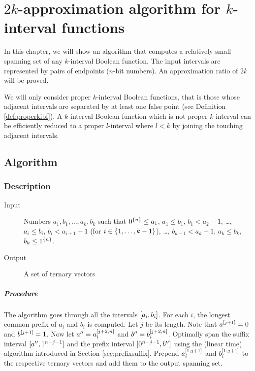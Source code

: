 \chapter{\texorpdfstring{$2k$}{2k}-approximation algorithm
for \texorpdfstring{$k$}{k}-interval functions}
\label{chap:2kapprox}


In this chapter,
we will show an algorithm that computes
a relatively
small spanning set
of any $k$-interval Boolean function.
The input intervals are represented by pairs of endpoints
($n$-bit numbers).
An approximation ratio of $2k$ will be proved.

We will only consider
proper $k$-interval Boolean functions,
that is those whose adjacent intervals are separated by
at least one false point
(see Definition \ref{def:properkibf}).
A $k$-interval Boolean function
which is not proper $k$-interval
can be efficiently reduced to a proper $l$-interval
where $l < k$
by joining the touching adjacent intervals.

\section{Algorithm}

\subsection{Description}

\begin{description}
\item[Input] Numbers $a_1, b_1, \ldots, a_k, b_k$
such that
$0^{\{n\}} \leq a_1$,
$a_1 \leq b_1$,
$b_1 < a_2 - 1$,
\ldots,
$a_i \leq b_i$,
$b_i < a_{i+1} - 1$
(for $i \in \{1, \ldots, k-1\}$),
\ldots,
$b_{k-1} < a_k - 1$,
$a_k \leq b_k$,
$b_k \leq 1^{\{n\}}$.

\item[Output] A set of ternary vectors
\end{description}

\paragraph{Procedure}
The algorithm goes through
all the intervals $[a_i, b_i]$.
For each $i$, the longest common prefix of $a_i$ and $b_i$
is computed. Let $j$ be its length.
Note that $a^{[j+1]} = 0$ and $b^{[j+1]} = 1$.
Now let $a'' = a_i^{[j+2, n]}$
and $b'' = b_i^{[j+2, n]}$.
Optimally span the suffix interval
$[a'', 1^{n-j-1}]$
and the prefix interval
$[0^{n-j-1}, b'']$
using the (linear time) algorithm
introduced in Section \ref{sec:prefixsuffix}.
Prepend $a_i^{[1, j+1]}$
and $b_i^{[1, j+1]}$
to the respective ternary vectors
and add them to the output spanning set.

